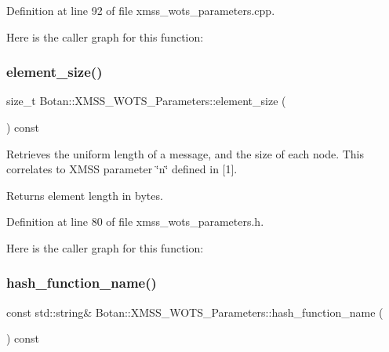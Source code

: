 Definition at line 92 of file xmss\+\_\+wots\+\_\+parameters.\+cpp.

Here is the caller graph for this function\+:
\mbox{\label{class_botan_1_1_x_m_s_s___w_o_t_s___parameters_a41865ec18f86aa5a995de1c452df2b65}} 
\subsubsection{\texorpdfstring{element\+\_\+size()}{element\_size()}}
{\footnotesize\ttfamily size\+\_\+t Botan\+::\+X\+M\+S\+S\+\_\+\+W\+O\+T\+S\+\_\+\+Parameters\+::element\+\_\+size (\begin{DoxyParamCaption}{ }\end{DoxyParamCaption}) const\hspace{0.3cm}{\ttfamily [inline]}}

Retrieves the uniform length of a message, and the size of each node. This correlates to X\+M\+SS parameter \char`\"{}n\char`\"{} defined in \mbox{[}1\mbox{]}.

\begin{DoxyReturn}{Returns}
element length in bytes. 
\end{DoxyReturn}


Definition at line 80 of file xmss\+\_\+wots\+\_\+parameters.\+h.

Here is the caller graph for this function\+:
\mbox{\label{class_botan_1_1_x_m_s_s___w_o_t_s___parameters_af21ced80c6176475b613ab966811e6aa}} 
\subsubsection{\texorpdfstring{hash\+\_\+function\+\_\+name()}{hash\_function\_name()}}
{\footnotesize\ttfamily const std\+::string\& Botan\+::\+X\+M\+S\+S\+\_\+\+W\+O\+T\+S\+\_\+\+Parameters\+::hash\+\_\+function\+\_\+name (\begin{DoxyParamCaption}{ }\end{DoxyParamCaption}) const\hspace{0.3cm}{\ttfamily [inline]}}

